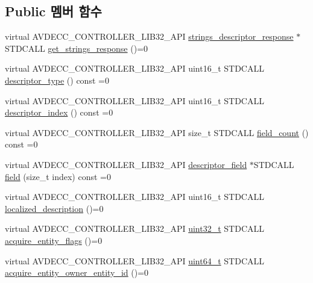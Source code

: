 \subsection*{Public 멤버 함수}
\begin{DoxyCompactItemize}
\item 
virtual A\+V\+D\+E\+C\+C\+\_\+\+C\+O\+N\+T\+R\+O\+L\+L\+E\+R\+\_\+\+L\+I\+B32\+\_\+\+A\+PI \hyperlink{classavdecc__lib_1_1strings__descriptor__response}{strings\+\_\+descriptor\+\_\+response} $\ast$S\+T\+D\+C\+A\+LL \hyperlink{classavdecc__lib_1_1strings__descriptor_a313776812dd7fa955eb6e60c9c92956a}{get\+\_\+strings\+\_\+response} ()=0
\item 
virtual A\+V\+D\+E\+C\+C\+\_\+\+C\+O\+N\+T\+R\+O\+L\+L\+E\+R\+\_\+\+L\+I\+B32\+\_\+\+A\+PI uint16\+\_\+t S\+T\+D\+C\+A\+LL \hyperlink{classavdecc__lib_1_1descriptor__base_a5112b70022171063ec5d3242bee9910e}{descriptor\+\_\+type} () const =0
\item 
virtual A\+V\+D\+E\+C\+C\+\_\+\+C\+O\+N\+T\+R\+O\+L\+L\+E\+R\+\_\+\+L\+I\+B32\+\_\+\+A\+PI uint16\+\_\+t S\+T\+D\+C\+A\+LL \hyperlink{classavdecc__lib_1_1descriptor__base_a7eed5583bffdf72d89021b188648c1b5}{descriptor\+\_\+index} () const =0
\item 
virtual A\+V\+D\+E\+C\+C\+\_\+\+C\+O\+N\+T\+R\+O\+L\+L\+E\+R\+\_\+\+L\+I\+B32\+\_\+\+A\+PI size\+\_\+t S\+T\+D\+C\+A\+LL \hyperlink{classavdecc__lib_1_1descriptor__base_ab1edf4996377ed957088a7b3b16aca7d}{field\+\_\+count} () const =0
\item 
virtual A\+V\+D\+E\+C\+C\+\_\+\+C\+O\+N\+T\+R\+O\+L\+L\+E\+R\+\_\+\+L\+I\+B32\+\_\+\+A\+PI \hyperlink{classavdecc__lib_1_1descriptor__field}{descriptor\+\_\+field} $\ast$S\+T\+D\+C\+A\+LL \hyperlink{classavdecc__lib_1_1descriptor__base_aa3716832eed0b6f6dcfba358c5d2c601}{field} (size\+\_\+t index) const =0
\item 
virtual A\+V\+D\+E\+C\+C\+\_\+\+C\+O\+N\+T\+R\+O\+L\+L\+E\+R\+\_\+\+L\+I\+B32\+\_\+\+A\+PI uint16\+\_\+t S\+T\+D\+C\+A\+LL \hyperlink{classavdecc__lib_1_1descriptor__base_a1fb9de45567df344090a1407aa6b775f}{localized\+\_\+description} ()=0
\item 
virtual A\+V\+D\+E\+C\+C\+\_\+\+C\+O\+N\+T\+R\+O\+L\+L\+E\+R\+\_\+\+L\+I\+B32\+\_\+\+A\+PI \hyperlink{parse_8c_a6eb1e68cc391dd753bc8ce896dbb8315}{uint32\+\_\+t} S\+T\+D\+C\+A\+LL \hyperlink{classavdecc__lib_1_1descriptor__base_a42f2a796375edd05c8d29856c018042d}{acquire\+\_\+entity\+\_\+flags} ()=0
\item 
virtual A\+V\+D\+E\+C\+C\+\_\+\+C\+O\+N\+T\+R\+O\+L\+L\+E\+R\+\_\+\+L\+I\+B32\+\_\+\+A\+PI \hyperlink{parse_8c_aec6fcb673ff035718c238c8c9d544c47}{uint64\+\_\+t} S\+T\+D\+C\+A\+LL \hyperlink{classavdecc__lib_1_1descriptor__base_a6480d803970d505ce7a9b429a6eb71bd}{acquire\+\_\+entity\+\_\+owner\+\_\+entity\+\_\+id} ()=0

\end{DoxyCompactItemize}
